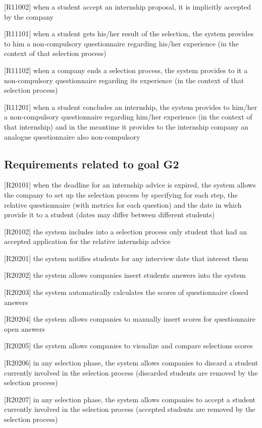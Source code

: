 		[R11002] when a student accept an internship proposal, it is implicitly accepted by the company 
		
		[R11101] when a student gets his/her result of the selection, the system provides to him a non-compulsory questionnaire regarding his/her experience (in the context of that selection process)
		
		[R11102] when a company ends a selection process, the system provides to it a non-compulsory questionnaire regarding its experience (in the context of that selection process) 
		
		[R11201] when a student concludes an internship, the system provides to him/her a non-compulsory questionnaire regarding him/her experience (in the context of that internship) and in the meantime it provides to the internship company an analogue questionnaire also non-compulsory 
		
		\subsection{Requirements related to goal G2}
		
		[R20101] when the deadline for an internship advice is expired, the system allows the company to set up the selection process by specifying for each step, the relative questionnaire (with metrics for each question) and the date in which provide it to a student (dates may differ between different students)
		
		[R20102] the system includes into a selection process only student that had an accepted application for the relative internship advice
		
		[R20201] the system notifies students for any interview date that interest them
		
		[R20202] the system allows companies insert students answers into the system
		
		[R20203] the system automatically calculates the scores of questionnaire closed answers
		
		[R20204] the system allows companies to manually insert scores for questionnaire open answers
		
		[R20205] the system allows companies to visualize and compare selections scores
		
		[R20206] in any selection phase, the system allows companies to discard a student currently involved in the selection process (discarded students are removed by the selection process)
		
		[R20207] in any selection phase, the system allows companies to accept a student currently involved in the selection process (accepted students are removed by the selection process)
		
